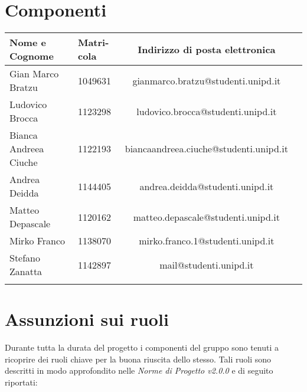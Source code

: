 \section{Componenti}
\label{componenti}
		\begin{tabularx}{\textwidth}{|X|X|c|X|}
			\hline
			\textbf{Nome e Cognome} &\textbf{Matri-}\newline \textbf{cola} & \textbf{Indirizzo di posta elettronica} \\
			\hline 
			Gian Marco Bratzu & 1049631 &gianmarco.bratzu@studenti.unipd.it \\
			\hline
			Ludovico Brocca & 1123298 & ludovico.brocca@studenti.unipd.it \\
			\hline
			Bianca Andreea Ciuche & 1122193 & biancaandreea.ciuche@studenti.unipd.it \\
			\hline
			Andrea Deidda & 1144405 & andrea.deidda@studenti.unipd.it \\
			\hline
			Matteo Depascale & 1120162 & matteo.depascale@studenti.unipd.it \\
			\hline
			Mirko Franco & 1138070 &  mirko.franco.1@studenti.unipd.it \\
			\hline
			Stefano Zanatta & 1142897 & mail@studenti.unipd.it \\
			\hline
			\caption{Componenti}
		\end{tabularx}

\section{Assunzioni sui ruoli}
	Durante tutta la durata del progetto i componenti del gruppo sono tenuti a ricoprire dei ruoli chiave per la buona riuscita dello stesso.
	Tali ruoli sono descritti in modo approfondito nelle \textit{Norme di Progetto v2.0.0} e di seguito riportati:
	
